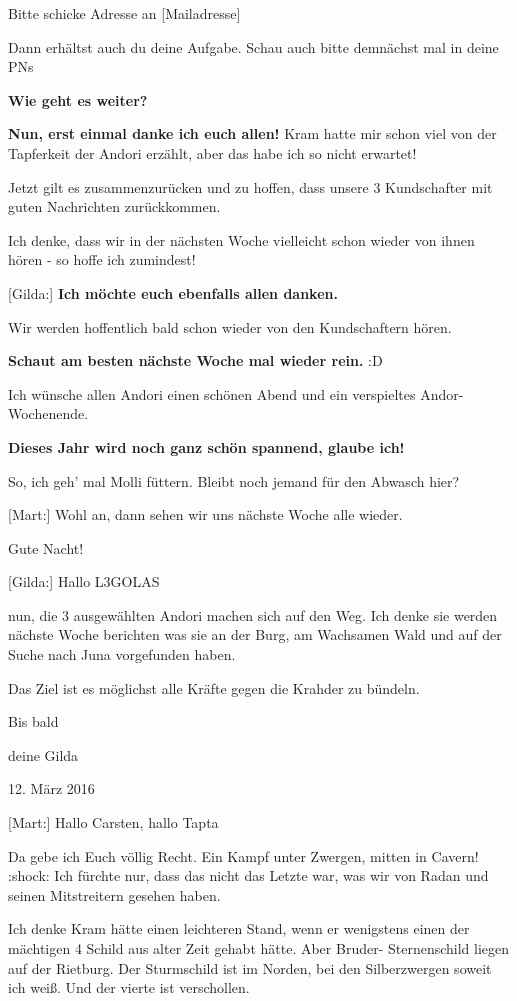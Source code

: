 \documentclass[10pt, a4paper, oneside]{book}
\begin{document}
\begin{multicols}{2}
Bitte schicke Adresse an [Mailadresse]

Dann erhältst auch du deine Aufgabe. Schau auch bitte demnächst mal in deine PNs

\textbf{Wie geht es weiter?}

\textbf{Nun, erst einmal danke ich euch allen!} Kram hatte mir schon viel von der Tapferkeit der Andori erzählt, aber das habe ich so nicht erwartet!

Jetzt gilt es zusammenzurücken und zu hoffen, dass unsere 3 Kundschafter mit guten Nachrichten zurückkommen.

Ich denke, dass wir in der nächsten Woche vielleicht schon wieder von ihnen hören - so hoffe ich zumindest!

[Gilda:] \textbf{Ich möchte euch ebenfalls allen danken.}

Wir werden hoffentlich bald schon wieder von den Kundschaftern hören.

\textbf{Schaut am besten nächste Woche mal wieder rein.} :D

Ich wünsche allen Andori einen schönen Abend und ein verspieltes Andor-Wochenende.

\textbf{Dieses Jahr wird noch ganz schön spannend, glaube ich!}

So, ich geh' mal Molli füttern. Bleibt noch jemand für den Abwasch hier?

[Mart:] Wohl an, dann sehen wir uns nächste Woche alle wieder.

Gute Nacht!

[Gilda:] Hallo L3GOLAS

nun, die 3 ausgewählten Andori machen sich auf den Weg. Ich denke sie werden nächste Woche berichten was sie an der Burg, am Wachsamen Wald und auf der Suche nach Juna vorgefunden haben.

Das Ziel ist es möglichst alle Kräfte gegen die Krahder zu bündeln.

Bis bald

deine Gilda

\begin{center}
    12. März 2016
\end{center}


[Mart:] Hallo Carsten, hallo Tapta

Da gebe ich Euch völlig Recht. Ein Kampf unter Zwergen, mitten in Cavern! :shock: Ich fürchte nur, dass das nicht das Letzte war, was wir von Radan und seinen Mitstreitern gesehen haben.

Ich denke Kram hätte einen leichteren Stand, wenn er wenigstens einen der mächtigen 4 Schild aus alter Zeit gehabt hätte. Aber Bruder- Sternenschild liegen auf der Rietburg. Der Sturmschild ist im Norden, bei den Silberzwergen soweit ich weiß. Und der vierte ist verschollen.


\end{multicols}
\end{document}
